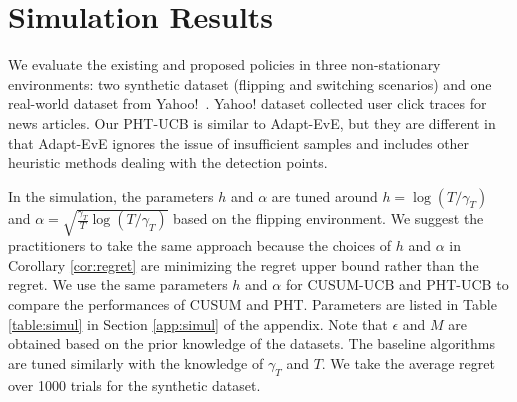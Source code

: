 \documentclass[letterpaper]{article} %
\newcommand{\blue}{}
\newcommand{\green}{}
\begin{document}
\section{Simulation Results}\label{sec:simul}
We evaluate the
{\blue existing and proposed policies 
in three non-stationary environments:
two synthetic dataset (flipping and switching scenarios) and one
real-world dataset from Yahoo!~\cite{YahooWebScope}.
Yahoo! dataset collected user click traces for news articles.}
Our PHT-UCB is similar to Adapt-EvE, but they are different in that Adapt-EvE ignores the issue of insufficient samples and includes other {\blue heuristic} methods dealing with the detection points. 

{\green
In the simulation, the parameters $h$ and $\alpha$ are tuned around
$h=\log(T/\gamma_T)$ and
$\alpha=\sqrt{\frac{\gamma_T}{T}\log(T/\gamma_T)}$ based on the
flipping environment. We suggest the practitioners to take the same approach because the choices of $h$ and $\alpha$ in Corollary \ref{cor:regret} are minimizing the regret upper bound rather than the regret. We use the same parameters $h$ and $\alpha$ for
CUSUM-UCB and PHT-UCB to compare the performances of CUSUM and
PHT. Parameters are listed in Table \ref{table:simul} in Section \ref{app:simul} of the appendix. Note that $\epsilon$ and $M$ are obtained based on the prior knowledge of the datasets.
The baseline algorithms are tuned similarly with the knowledge of $\gamma_T$ and $T$.
We take the average regret over 1000 trials for the synthetic dataset.%
}
\end{document}
